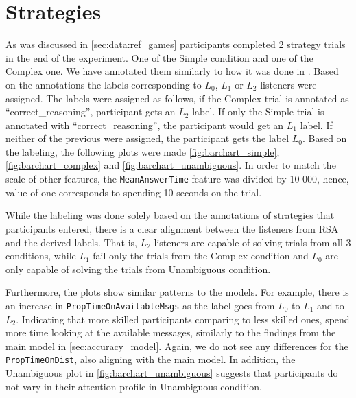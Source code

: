 \section{Strategies}

As was discussed in \autoref{sec:data:ref_games} participants completed 2 strategy trials in the end of the experiment. One of the Simple condition and one of the Complex one. We have annotated them similarly to how it was done in \cite{Mayn_2023}. Based on the annotations the labels corresponding to $L_0$, $L_1$ or $L_2$ listeners were assigned. The labels were assigned as follows, if the Complex trial is annotated as ``correct\_reasoning'', participant gets an $L_2$ label. If only the Simple trial is annotated with ``correct\_reasoning'', the participant would get an $L_1$ label. If neither of the previous were assigned, the participant gets the label $L_0$. Based on the labeling, the following plots were made \autoref{fig:barchart_simple}, \autoref{fig:barchart_complex} and \autoref{fig:barchart_unambiguous}. In order to match the scale of other features, the \texttt{MeanAnswerTime} feature was divided by 10 000, hence, value of one corresponds to spending 10 seconds on the trial.

While the labeling was done solely based on the annotations of strategies that participants entered, there is a clear alignment between the listeners from RSA and the derived labels. That is, $L_2$ listeners are capable of solving trials from all 3 conditions, while $L_1$ fail only the trials from the Complex condition and $L_0$ are only capable of solving the trials from Unambiguous condition. 

Furthermore, the plots show similar patterns to the models. For example, there is an increase in \texttt{PropTimeOnAvailableMsgs} as the label goes from $L_0$ to $L_1$ and to $L_2$. Indicating that more skilled participants comparing to less skilled ones, spend more time looking at the available messages, similarly to the findings from the main model in \autoref{sec:accuracy_model}. Again, we do not see any differences for the \texttt{PropTimeOnDist}, also aligning with the main model. In addition, the Unambiguous plot in \autoref{fig:barchart_unambiguous} suggests that participants do not vary in their attention profile in Unambiguous condition.

